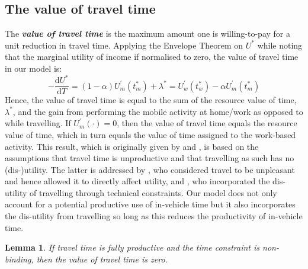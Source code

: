 \documentclass[12pt,a4paper,british]{article}
\newtheorem{lemma}{Lemma}[section]
\begin{document}
\subsection*{The value of travel time}
The \textbf{\textit{value of travel time}} is the maximum amount one is willing-to-pay for a unit reduction in travel time. Applying the Envelope Theorem on $U^{\ast}$ while noting that the marginal utility of income if normalised to zero, the value of travel time in our model is:
\begin{equation}
-\frac{\mathrm{d}U^{\ast}}{\mathrm{d}T}  = \left(1 - \alpha\right) U_{m}^{\prime}\left(t_{m}^{\ast}\right) + \lambda^{\ast} = U_{w}^{\prime}\left(t_{w}^{\ast}\right) - \alpha U_{m}^{\prime}\left(t_{m}^{\ast}\right)
\label{eq:VOT_det}
\end{equation}
Hence, the value of travel time is equal to the sum of the resource value of time, $\lambda^{\ast}$, and the gain from performing the mobile activity at home/work as opposed to while travelling. If $U_m^{\prime}\left( \cdot\right)=0$, then the value of travel time equals the resource value of time, which in turn equals the value of time assigned to the work-based activity. This result, which is originally given by \cite{Becker1965TheoryAllocationTime} and \citet{Johnson1966TravelTimePrice}, is based on the assumptions that travel time is unproductive and that travelling as such has no (dis-)utility. The latter is addressed by \citet{Oort1969EvaluationTravellingTime}, who considered travel to be unpleasant and hence allowed it to directly affect utility, and \cite{DeSerpa1971TheoryEconomicsTime}, who incorporated the dis-utility of travelling through technical constraints. Our model does not only account for a potential productive use of in-vehicle time but it also incorporates the dis-utility from travelling so long as this reduces the productivity of in-vehicle time.


\begin{lemma}
If travel time is fully productive and the time constraint is non-binding, then the value of travel time is zero.
\end{lemma}

\end{document}
